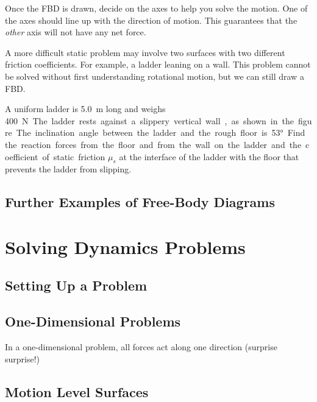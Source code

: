 Once the FBD is drawn, decide on the axes to help you solve the motion. One of
the axes should line up with the direction of motion. This guarantees that
the \emph{other} axis will not have any net force.

A more difficult static problem may involve two surfaces with two different
friction coefficients. For example, a ladder leaning on a wall. This problem
cannot be solved without first understanding rotational motion, but we can
still draw a FBD.
\begin{example}
  A uniform ladder is \SI{5.0}{\metre} long and weighs \SI{400}\newton. The
  ladder rests against a slippery vertical wall, as shown in the figure. The
  inclination angle between the ladder and the rough floor is \ang{53}. Find
  the reaction forces from the floor and from the wall on the ladder and the
  coefficient of static friction $\mu_s$ at the interface of the ladder with
  the floor that prevents the ladder from slipping.
  \begin{center}
  \end{center}
\end{example}

\subsection{Further Examples of Free-Body Diagrams}


\section{Solving Dynamics Problems}

\subsection{Setting Up a Problem}

\subsection{One-Dimensional Problems}

In a one-dimensional problem, all forces act along one direction (surprise
surprise!)

\subsection{Motion Level Surfaces}


